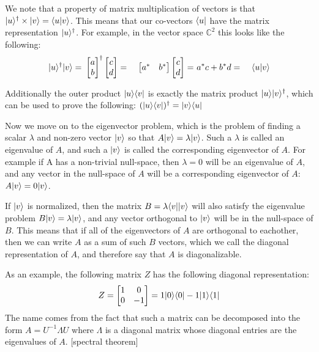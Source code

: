 We note that a property of matrix multiplication of vectors is that $| u \rangle^\dagger\times| v \rangle = \langle u | v \rangle$. This means that our co-vectors $\langle u |$ have the matrix representation $| u \rangle^\dagger$. For example, in the vector space $\mathbb{C}^2$ this looks like the following:
\begin{align*}
	\ket{u}^\dagger\ket{v}
	=&\ 
	\left[\begin{matrix}
		a\\
		b
	\end{matrix}\right]^\dagger
	\left[\begin{matrix}
		c\\
		d
	\end{matrix}\right]
	=&\ 
	\left[\begin{matrix}
		a^*&b^*
	\end{matrix}\right]
	\left[\begin{matrix}
		c\\
		d
	\end{matrix}\right]
	=&\ a^*c+b^*d
	=&\ \braket{u}{v}
\end{align*}

Additionally the outer product $| u \rangle\langle v |$ is exactly the matrix product $| u \rangle| v \rangle^\dagger$, which can be used to prove the following:
$(| u \rangle\langle v |)^\dagger = | v \rangle\langle u |$

Now we move on to the eigenvector problem, which is the problem of finding a scalar $\lambda$ and non-zero vector $| v \rangle$ so that $A| v \rangle=\lambda| v \rangle$. Such a $\lambda$ is called an eigenvalue of $A$, and such a $| v \rangle$ is called the corresponding eigenvector of $A$. For example if A has a non-trivial null-space, then $\lambda=0$ will be an eigenvalue of $A$, and any vector in the null-space of $A$ will be a corresponding eigenvector of $A$: $A| v \rangle = 0| v \rangle$.

If $| v \rangle$ is normalized, then the matrix $B=\lambda\langle v || v \rangle$ will also satisfy the eigenvalue problem $B| v \rangle=\lambda| v \rangle$, and any vector orthogonal to $| v \rangle$ will be in the null-space of $B$. This means that if all of the eigenvectors of $A$ are orthogonal to eachother, then we can write $A$ as a sum of such $B$ vectors, which we call the diagonal representation of $A$, and therefore say that $A$ is diagonalizable.

As an example, the following matrix $Z$ has the following diagonal representation:
\begin{align*}
	Z = \left[\begin{matrix}
		1&0\\
		0&-1
	\end{matrix}\right] = 1| 0 \rangle\langle 0 | - 1| 1 \rangle\langle 1 |
\end{align*}
The name comes from the fact that such a matrix can be decomposed into the form $A = U^{-1}\Lambda U$ where $\Lambda$ is a diagonal matrix whose diagonal entries are the eigenvalues of $A$.
[spectral theorem]

